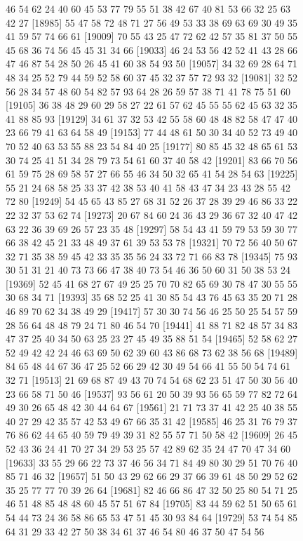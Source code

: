 \documentclass{article}
\begin{document}
\begin{figure}[H]
\begin{Schunk}
\begin{Soutput}
[18961] 46 54 62 24 40 60 45 53 77 79 55 51 38 42 67 40 81 53 66 32 25 63 42 27
[18985] 55 47 58 72 48 71 27 56 49 53 33 38 69 63 69 30 49 35 41 59 57 74 66 61
[19009] 70 55 43 25 47 72 62 42 57 35 81 37 50 55 45 68 36 74 56 45 45 31 34 66
[19033] 46 24 53 56 42 52 41 43 28 66 47 46 87 54 28 50 26 45 41 60 38 54 93 50
[19057] 34 32 69 28 64 71 48 34 25 52 79 44 59 52 58 60 37 45 32 37 57 72 93 32
[19081] 32 52 56 28 34 57 48 60 54 82 57 93 64 28 26 59 57 38 71 41 78 75 51 60
[19105] 36 38 48 29 60 29 58 27 22 61 57 62 45 55 55 62 45 63 32 35 41 88 85 93
[19129] 34 61 37 32 53 42 55 58 60 48 48 82 58 47 47 40 23 66 79 41 63 64 58 49
[19153] 77 44 48 61 50 30 34 40 52 73 49 40 70 52 40 63 53 55 88 23 54 84 40 25
[19177] 80 85 45 32 48 65 61 53 30 74 25 41 51 34 28 79 73 54 61 60 37 40 58 42
[19201] 83 66 70 56 61 59 75 28 69 58 57 27 66 55 46 34 50 32 65 41 54 28 54 63
[19225] 55 21 24 68 58 25 33 37 42 38 53 40 41 58 43 47 34 23 43 28 55 42 72 80
[19249] 54 45 65 43 85 27 68 31 52 26 37 28 39 29 46 86 33 22 22 32 37 53 62 74
[19273] 20 67 84 60 24 36 43 29 36 67 32 40 47 42 63 22 36 39 69 26 57 23 35 48
[19297] 58 54 43 41 59 79 53 59 30 77 66 38 42 45 21 33 48 49 37 61 39 53 53 78
[19321] 70 72 56 40 50 67 32 71 35 38 59 45 42 33 35 35 56 24 33 72 71 66 83 78
[19345] 75 93 30 51 31 21 40 73 73 66 47 38 40 73 54 46 36 50 60 31 50 38 53 24
[19369] 52 45 41 68 27 67 49 25 25 70 70 82 65 69 30 78 47 30 55 55 30 68 34 71
[19393] 35 68 52 25 41 30 85 54 43 76 45 63 35 20 71 28 46 89 70 62 34 38 49 29
[19417] 57 30 30 74 56 46 25 50 25 54 57 59 28 56 64 48 48 79 24 71 80 46 54 70
[19441] 41 88 71 82 48 57 34 83 47 37 25 40 34 50 63 25 23 27 45 49 35 88 51 54
[19465] 52 58 62 27 52 49 42 42 24 46 63 69 50 62 39 60 43 86 68 73 62 38 56 68
[19489] 84 65 48 44 67 36 47 25 52 66 29 42 30 49 54 66 41 55 50 54 74 61 32 71
[19513] 21 69 68 87 49 43 70 74 54 68 62 23 51 47 50 30 56 40 23 66 58 71 50 46
[19537] 93 56 61 20 50 39 93 56 65 59 77 82 72 64 49 30 26 65 48 42 30 44 64 67
[19561] 21 71 73 37 41 42 25 40 38 55 40 27 29 42 35 57 42 53 49 67 66 35 31 42
[19585] 46 25 31 76 79 37 76 86 62 44 65 40 59 79 49 39 31 82 55 57 71 50 58 42
[19609] 26 45 52 43 36 24 41 70 27 34 29 53 25 57 42 89 62 35 24 47 70 47 34 60
[19633] 33 55 29 66 22 73 37 46 56 34 71 84 49 80 30 29 51 70 76 40 85 71 46 32
[19657] 51 50 43 29 62 66 29 37 66 39 61 48 50 29 52 62 35 25 77 77 70 39 26 64
[19681] 82 46 66 86 47 32 50 25 80 54 71 25 46 51 48 85 48 48 60 45 57 51 67 84
[19705] 83 44 59 62 51 50 65 61 54 44 73 24 36 58 86 65 53 47 51 45 30 93 84 64
[19729] 53 74 54 85 64 31 29 33 42 27 50 38 34 61 37 46 54 80 46 37 50 47 54 56

\end{Soutput}
\end{Schunk}
\end{figure}
\end{document}

